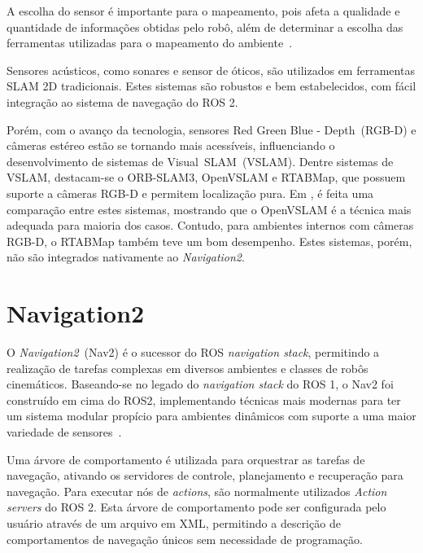\documentclass[repeatfields,xlists,xpacks,oneside,yearsonly]{ufrgscca}
\begin{document}
A escolha do sensor é importante para o mapeamento,
pois afeta a qualidade e quantidade de informações obtidas pelo robô, além
de determinar a escolha das ferramentas utilizadas para o mapeamento do
ambiente~\cite{SensorAndSLAM}.

Sensores acústicos, como sonares e sensor de óticos, são utilizados
em ferramentas SLAM 2D tradicionais. Estes sistemas são robustos e bem estabelecidos,
com fácil integração ao sistema de navegação do ROS 2.

Porém, com o avanço da tecnologia, sensores Red Green Blue - Depth~(RGB-D)
e câmeras estéreo estão se tornando mais acessíveis, influenciando o
desenvolvimento de sistemas de Visual~SLAM~(VSLAM).
Dentre sistemas de VSLAM, destacam-se o ORB-SLAM3, OpenVSLAM e RTABMap, que possuem suporte
a câmeras RGB-D e permitem localização pura.
Em \textcite{VSLAM}, é feita uma comparação entre estes sistemas, mostrando que o
OpenVSLAM é a técnica mais adequada para maioria dos casos.
Contudo, para ambientes internos com câmeras RGB-D, o RTABMap também teve um bom desempenho.
Estes sistemas, porém, não são integrados nativamente ao \textit{Navigation2}.


\section{Navigation2}

O \textit{Navigation2}~(Nav2) é o sucessor do ROS \textit{navigation stack}, permitindo
a realização de tarefas complexas em diversos ambientes e classes de robôs cinemáticos.
Baseando-se no legado do \textit{navigation stack} do ROS 1, o Nav2 foi construído em cima
do ROS2, implementando técnicas mais modernas para ter um sistema modular propício para
ambientes dinâmicos com suporte a uma maior variedade de sensores~\cite{Nav2}.

Uma árvore de comportamento é utilizada para
orquestrar as tarefas de navegação, ativando os servidores de controle, planejamento e
recuperação para navegação.
Para executar nós de \textit{actions}, são normalmente utilizados
\textit{Action servers} do ROS 2.
Esta árvore de comportamento pode ser configurada pelo usuário através de um arquivo
em XML, permitindo a descrição de comportamentos de navegação únicos sem
necessidade de programação.
\end{document}
